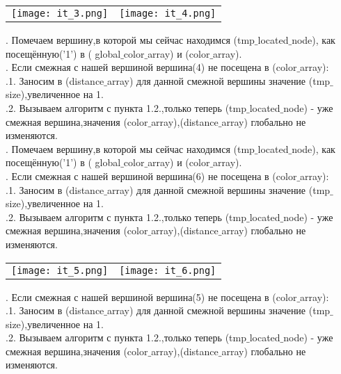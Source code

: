\documentclass[a4paper,11pt]{article}
\begin{document}
\begin{tabulary}{\linewidth}{}
  \texttt{[image: it\_3.png]} 
  &
  \texttt{[image: it\_4.png]}
   \\                                                     
\end{tabulary}
\begin{flushleft}
\Large{. Помечаем вершину,в которой мы сейчас находимся (tmp$\_$located$\_$node), как посещённую('1') в ( global$\_$color$\_$array) и (color$\_$array). \\
. Если смежная с нашей вершиной вершина(4) не посещена в (color$\_$array): \\
\quad {}.1. Заносим в (distance$\_$array) для данной смежной вершины значение (tmp$\_$size),увеличенное на 1.\\
\quad {}.2. Вызываем алгоритм с пункта 1.2.,только теперь (tmp$\_$located$\_$node) - уже смежная вершина,значения (color$\_$array),(distance$\_$array) глобально не изменяются. \\
. Помечаем вершину,в которой мы сейчас находимся (tmp$\_$located$\_$node), как посещённую('1') в ( global$\_$color$\_$array) и (color$\_$array). \\
. Если смежная с нашей вершиной вершина(6) не посещена в (color$\_$array): \\
\quad {}.1. Заносим в (distance$\_$array) для данной смежной вершины значение (tmp$\_$size),увеличенное на 1.\\
\quad {}.2. Вызываем алгоритм с пункта 1.2.,только теперь (tmp$\_$located$\_$node) - уже смежная вершина,значения (color$\_$array),(distance$\_$array) глобально не изменяются. \\
\begin{tabulary}{\linewidth}{}
  \texttt{[image: it\_5.png]} 
  &
  \texttt{[image: it\_6.png]}
   \\                                                     
\end{tabulary}
. Если смежная с нашей вершиной вершина(5) не посещена в (color$\_$array): \\
\quad {}.1. Заносим в (distance$\_$array) для данной смежной вершины значение (tmp$\_$size),увеличенное на 1.\\
\quad {}.2. Вызываем алгоритм с пункта 1.2.,только теперь (tmp$\_$located$\_$node) - уже смежная вершина,значения (color$\_$array),(distance$\_$array) глобально не изменяются. \\
}
\end{flushleft}
\end{document}
